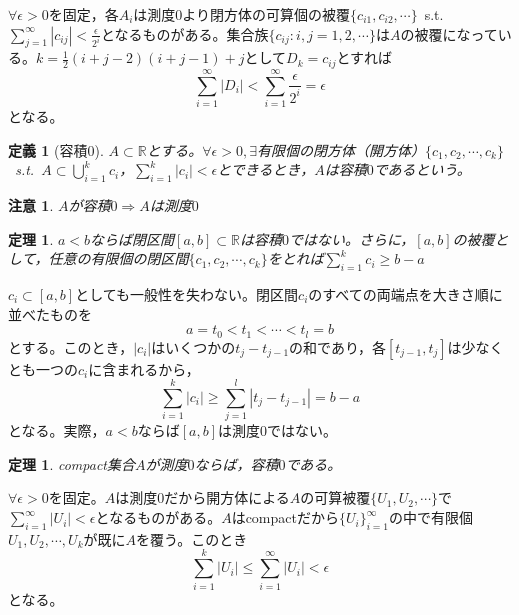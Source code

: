 \documentclass[dvipdfmx,a4j,10pt]{jsarticle}
\makeatletter
\theoremstyle{mystyle1}
\newtheorem{thm}[dfn]{定理}
\theoremstyle{mystyle2}
\newtheorem{dfn*}{定義}
\newtheorem{note}{注意}
\renewenvironment{proof}[1][\proofname]{\par
  \pushQED{\qed}%
  \normalfont
  \topsep6\p@\@plus6\p@ \trivlist
  \item[\hskip\labelsep{\bfseries\sffamily #1}]\ignorespaces
}{%
  \popQED\endtrivlist\@endpefalse
}
\renewcommand\proofname{証明}
\makeatother
\begin{document}
\begin{proof}
	$\forall\epsilon>0$を固定，各$A_i$は測度$0$より閉方体の可算個の被覆$\{c_{i1},c_{i2},\cdots\}$\ {\rm s.t.}\ $\displaystyle\sum_{j=1}^\infty|c_{ij}|<\frac{\epsilon}{2^i}$となるものがある。集合族$\{c_{ij}:i,j=1,2,\cdots\}$は$A$の被覆になっている。$\displaystyle k=\frac{1}{2}(i+j-2)(i+j-1)+j$として$D_k=c_{ij}$とすれば
	\[
		\sum_{i=1}^\infty|D_i|<\sum_{i=1}^\infty\frac{\epsilon}{2^i}=\epsilon
	\]
	となる。
\end{proof}

\begin{dfn*}[容積0]
	$A\subset\mathbb{R}$とする。$\forall\epsilon>0,\exists$有限個の閉方体（開方体）$\{c_1,c_2,\cdots,c_k\}$\ s.t.\ $A\displaystyle\subset\bigcup_{i=1}^kc_i$，$\displaystyle\sum_{i=1}^k|c_i|<\epsilon$とできるとき，$A$は容積$0$であるという。
\end{dfn*}

\begin{note}
	$A$が容積$0\Rightarrow A$は測度$0$
\end{note}

\begin{framed}
	\begin{thm}\label{th3.5}
		$a<b$ならば閉区間$[a,b]\subset\mathbb{R}$は容積$0$ではない。さらに，$[a,b]$の被覆として，任意の有限個の閉区間$\{c_1,c_2,\cdots,c_k\}$をとれば$\sum_{i=1}^k c_i\geq b-a$
	\end{thm}
\end{framed}

\begin{proof}
	$c_i\subset [a,b]$としても一般性を失わない。閉区間$c_i$のすべての両端点を大きさ順に並べたものを
	\[
		a=t_0<t_1<\cdots<t_l=b
	\]
	とする。このとき，$|c_i|$はいくつかの$t_j-t_{j-1}$の和であり，各$[t_{j-1},t_j]$は少なくとも一つの$c_i$に含まれるから，
	\[
		\sum_{i=1}^k|c_i|\geq \sum_{j=1}^l|t_j-t_{j-1}|=b-a
	\]
	となる。実際，$a<b$ならば$[a,b]$は測度$0$ではない。
\end{proof}

\begin{framed}
	\begin{thm}\label{th3.6}
		compact集合$A$が測度$0$ならば，容積$0$である。
	\end{thm}
\end{framed}

\begin{proof}
	$\forall\epsilon>0$を固定。$A$は測度$0$だから開方体による$A$の可算被覆$\{U_1,U_2,\cdots\}$で$\displaystyle\sum_{i=1}^\infty|U_i|<\epsilon$となるものがある。$A$はcompactだから$\{U_i\}_{i=1}^\infty$の中で有限個$U_1,U_2,\cdots,U_k$が既に$A$を覆う。このとき
	\[
		\sum_{i=1}^k|U_i|\leq\sum_{i=1}^\infty|U_i|<\epsilon
	\]
	となる。
\end{proof}
\end{document}
